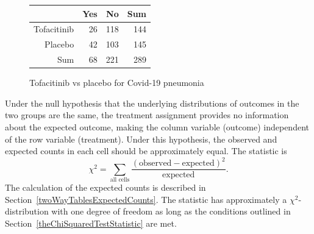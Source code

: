 \begin{figure}[ht]
\centering
\begin{tabular}{rrrr}
  \hline
 & Yes & No & Sum \\ 
  \hline
Tofacitinib & 26 & 118 & 144 \\ 
  Placebo & 42 & 103 & 145 \\ 
  Sum & 68 & 221 & 289 \\ 
   \hline
\end{tabular}
\caption{Tofacitinib vs placebo for Covid-19 pneumonia} 
\label{tofacitinibVsPlaceboTable}
\end{figure}

Under the null hypothesis that the underlying distributions of outcomes in the two groups are the same, the treatment assignment provides no information about the expected outcome, making the column variable (outcome) independent of the row variable (treatment). Under this hypothesis, the observed and expected counts in each cell should be approximately equal.  The statistic is 
\[\chi^2 = \sum_{\text{all cells}} \frac{(\text{observed} - \text{expected})^2}{\text{expected}}. \]
The calculation of the expected counts is described in Section~\ref{twoWayTablesExpectedCounts}.
The statistic has approximately a $\chi^2$-distribution with one degree of freedom as long as the conditions outlined in Section~\ref{theChiSquaredTestStatistic} are met.

